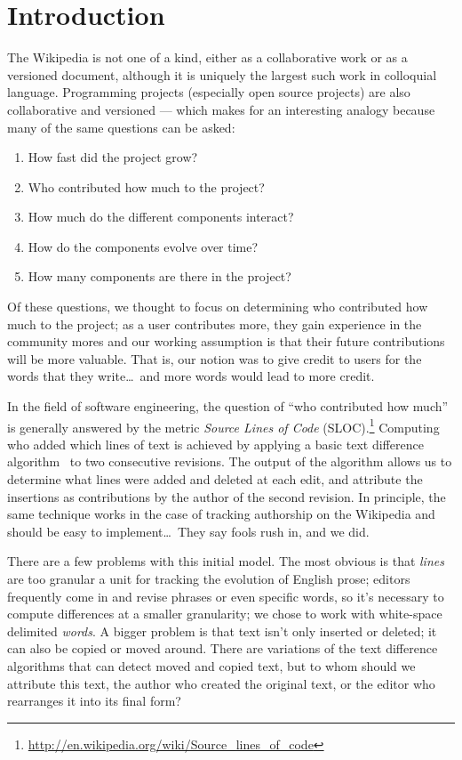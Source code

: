 
\section{Introduction}
\label{sec:diff-intro}

The Wikipedia is not one of a kind, either as a collaborative work or as
a versioned document, although it is uniquely the largest such work
in colloquial language.
Programming projects (especially open source projects)
are also collaborative and versioned --- which makes for
an interesting analogy because many of the same questions can be asked:
\begin{enumerate}
\item How fast did the project grow?
\item Who contributed how much to the project?
\item How much do the different components interact?
\item How do the components evolve over time?
\item How many components are there in the project?
\end{enumerate}
Of these questions, we thought to focus on determining who contributed
how much to the project; as a user contributes more, they gain experience
in the community mores and our working assumption is that their future
contributions will be more valuable.
That is, our notion was to give credit to users for the words that
they write\ldots\ and more words would lead to more credit.

In the field of software engineering, the question of ``who contributed
how much'' is generally answered by the metric
\textit{Source Lines of Code} (SLOC).\footnote{\url{http://en.wikipedia.org/wiki/Source_lines_of_code}}
Computing who added which lines of text is achieved
by applying a basic text difference
algorithm~\cite{Myers1986,Tichy1984,Burns1997} to two consecutive
revisions.
The output of the algorithm allows us to determine what lines were added and
deleted at each edit, and attribute the insertions as contributions by the
author of the second revision.
In principle, the same technique works in the case of tracking authorship
on the Wikipedia and should be easy to implement\ldots\ They say fools rush in, and we did.

There are a few problems with this initial model.
The most obvious is that \textit{lines} are too granular
a unit for tracking the evolution of English prose;
editors frequently come in and revise phrases or
even specific words, so it's necessary to compute
differences at a smaller granularity;
we chose to work with white-space delimited \textit{words}.
A bigger problem is that text isn't only inserted
or deleted; it can also be copied or moved around.
There are variations of the text difference algorithms that can
detect moved and copied text, but to whom should we attribute this text,
the author who created the original text, or the editor who rearranges it
into its final form?

